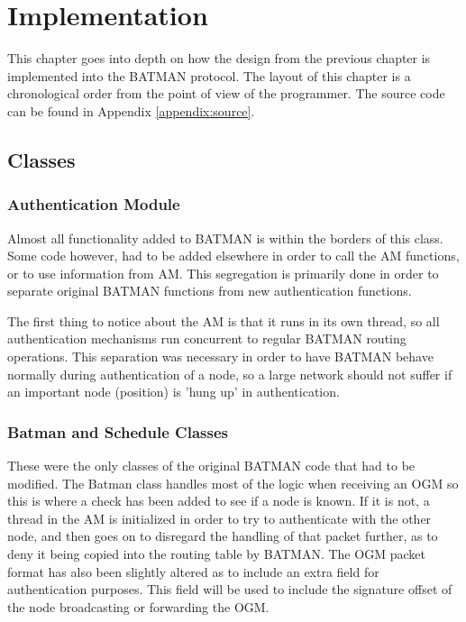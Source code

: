\chapter{Implementation}
\label{ch:implementation}
\acresetall

This chapter goes into depth on how the design from the previous chapter is
implemented into the BATMAN protocol. The layout of this chapter is a
chronological order from the point of view of the programmer. The source code
can be found in Appendix \ref{appendix:source}.


\section{Classes}

\subsection{Authentication Module}
Almost all functionality added to BATMAN is within the borders of this class.
Some code however, had to be added elsewhere in order to call the \ac{AM}
functions, or to use information from \ac{AM}. This segregation is primarily
done in order to separate original BATMAN functions from new authentication
functions.

The first thing to notice about the \ac{AM} is that it runs in its own thread,
so all authentication mechanisms run concurrent to regular BATMAN routing
operations. This separation was necessary in order to have BATMAN behave
normally during authentication of a node, so a large network should not suffer
if an important node (position) is 'hung up' in authentication.

\subsection{Batman and Schedule Classes}
These were the only classes of the original BATMAN code that had to be modified.
The Batman class handles most of the logic when receiving an \ac{OGM} so this is
where a check has been added to see if a node is known. If it is not, a thread
in the \ac{AM} is initialized in order to try to authenticate with the other
node, and then goes on to disregard the handling of that packet further, as to
deny it being copied into the routing table by BATMAN. The \ac{OGM} packet
format has also been slightly altered as to include an extra field for
authentication purposes. This field will be used to include the signature offset
of the node broadcasting or forwarding the \ac{OGM}.

